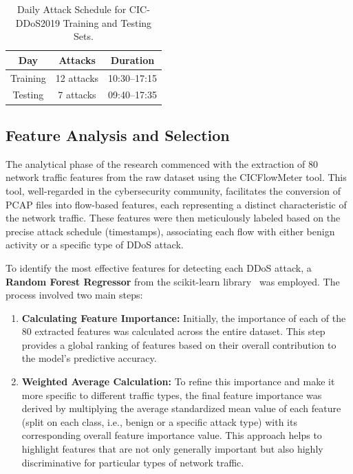 \documentclass[12pt]{report}
\begin{document}
\begin{table}[htbp]
\centering
\caption{Daily Attack Schedule for CIC-DDoS2019 Training and Testing Sets.}
\label{tab:attack_schedule}
\begin{tabular}{|c|c|c|}
\hline
\textbf{Day} & \textbf{Attacks} & \textbf{Duration} \\
\hline
Training & 12 attacks & 10:30--17:15 \\
Testing & 7 attacks & 09:40--17:35 \\
\hline
\end{tabular}
\end{table}

\subsection{Feature Analysis and Selection}

The analytical phase of the research commenced with the extraction of 80 network traffic features from the raw dataset using the CICFlowMeter tool. This tool, well-regarded in the cybersecurity community, facilitates the conversion of PCAP files into flow-based features, each representing a distinct characteristic of the network traffic. These features were then meticulously labeled based on the precise attack schedule (timestamps), associating each flow with either benign activity or a specific type of DDoS attack.

To identify the most effective features for detecting each DDoS attack, a \textbf{Random Forest Regressor} from the scikit-learn library~\cite{pedregosa2011scikit} was employed. The process involved two main steps:

\begin{enumerate}
\item \textbf{Calculating Feature Importance:} Initially, the importance of each of the 80 extracted features was calculated across the entire dataset. This step provides a global ranking of features based on their overall contribution to the model's predictive accuracy.
\item \textbf{Weighted Average Calculation:} To refine this importance and make it more specific to different traffic types, the final feature importance was derived by multiplying the average standardized mean value of each feature (split on each class, i.e., benign or a specific attack type) with its corresponding overall feature importance value. This approach helps to highlight features that are not only generally important but also highly discriminative for particular types of network traffic.
\end{enumerate}
\end{document}
